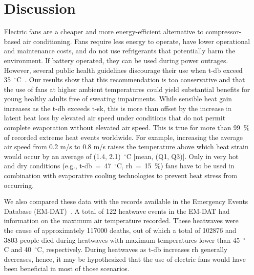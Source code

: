 
\section{Discussion}\label{sec:discussion}

Electric fans are a cheaper and more energy-efficient alternative to compressor-based air conditioning.
Fans require less energy to operate, have lower operational and maintenance costs, and do not use refrigerants that potentially harm the environment. 
If battery operated, they can be used during power outrages. 
However, several public health guidelines discourage their use when \acf{t-db} exceed 35~$^{\circ}$C~\cite{WMO2015}.
Our results show that this recommendation is too conservative and that the use of fans at higher ambient temperatures could yield substantial benefits for young healthy adults free of sweating impairments.
While sensible heat gain increases as the \ac{t-db} exceeds \acf{t-sk}, this is more than offset by the increase in latent heat loss by elevated air speed under conditions that do not permit complete evaporation without elevated air speed. 
This is true for more than 99~\% of recorded extreme heat events worldwide.
For example, increasing the average air speed from 0.2 m/s to 0.8 m/s raises the temperature above which heat strain would occur by an average of  (1.4, 2.1)~$^{\circ}$C [mean, (Q1, Q3)].
Only in very hot and dry conditions (e.g., \ac{t-db}~=~47~$^{\circ}$C, \ac{rh}~=~15~\%) fans have to be used in combination with evaporative cooling technologies to prevent heat stress from occurring.

We also compared these data with the records available in the Emergency Events Database (EM-DAT)~\cite{EMDATThe70:online}.
A total of 122 heatwave events in the EM-DAT had information on the maximum air temperature recorded.
These heatwaves were the cause of approximately 117000 deaths, out of which a total of 102876 and 3803 people died during heatwaves with maximum temperatures lower than 45~$^{\circ}$C and 40~$^{\circ}$C, respectively.
During heatwaves as \ac{t-db} increases \ac{rh} generally decreases, hence, it may be hypothesized that the use of electric fans would have been beneficial in most of those scenarios.

